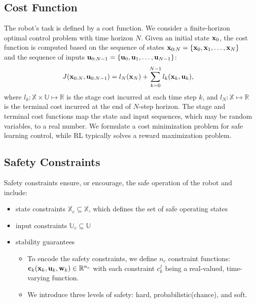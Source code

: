 \documentclass{article}
\begin{document}
\subsection{Cost Function}

The robot's task is defined by a cost function.
We consider a finite-horizon optimal control problem with time horizon $N$.
Given an initial state $\mathbf{x}_0$, the cost function is computed based on the sequence of states $\mathbf{x}_{0:N} = \{\mathbf{x}_0, \mathbf{x}_1, \ldots, \mathbf{x}_N\}$ and the sequence of inputs $\mathbf{u}_{0:N-1} = \{\mathbf{u}_0, \mathbf{u}_1, \ldots, \mathbf{u}_{N-1}\}$:
\begin{equation}
    J(\mathbf{x}_{0:N}, \mathbf{u}_{0:N-1}) = l_N(\mathbf{x}_N) + \sum^{N - 1}_{k = 0} l_k(\mathbf{x}_k, \mathbf{u}_k),
\end{equation}
where $l_k : \mathbb{X} \times \mathbb{U} \mapsto \mathbb{R}$ is the stage cost incurred at each time step $k$, and $l_N: \mathbb{X} \mapsto \mathbb{R}$ is the terminal cost incurred at the end of $N$-step horizon.
The stage and terminal cost functions map the state and input sequences, which may be random variables, to a real number.
We formulate a cost minimization problem for safe learning control, while RL typically solves a reward maximization problem.

\subsection{Safety Constraints}

Safety constraints ensure, or encourage, the safe operation of the robot and include:
\begin{itemize}
    \item state constraints $\mathbb{X}_c \subseteq \mathbb{X}$, which defines the set of safe operating states
    \item input constraints $\mathbb{U}_c \subseteq \mathbb{U}$
    \item stability guarantees
    \begin{itemize}
        \item To encode the safety constraints, we define $n_c$ constraint functions: $\mathbf{c}_k(\mathbf{x}_k, \mathbf{u}_k, \mathbf{w}_k) \in \mathbb{R}^{n_c}$ with each constraint $c^j_k$ being a real-valued, time-varying function.
        \item We introduce three levels of safety: hard, probabilistic(chance), and soft.
    \end{itemize}
\end{itemize}
\end{document}
